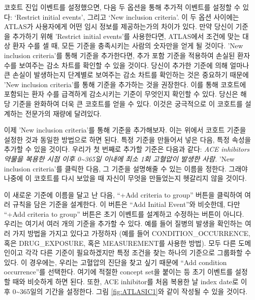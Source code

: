 \documentclass[10.5pt]{book}
\theoremstyle{definition}
\theoremstyle{definition}
\theoremstyle{definition}
\theoremstyle{remark}
\begin{document}
코호트 진입 이벤트를 설정했으면, 다음 두 옵션을 통해 추가적 이벤트를
설정할 수 있다: `Restrict initial events', 그리고 `New inclusion
criteria'. 이 두 옵션 사이에는 ATLAS가 사용자에게 어떤 임시 정보를
제공하는가의 차이가 있다. 만약 당신이 기준을 추가하기 위해 'Restrict
initial events'를 사용한다면, ATLAS에서 조건에 맞는 대상 환자 수를 셀
때, 모든 기준을 충족시키는 사람의 숫자만을 얻게 될 것이다. 'New
inclusion criteria'를 통해 기준을 추가한다면, 추가 포함 기준을 적용하여
손실된 환자 수를 보여주는 감소 차트를 확인할 수 있을 것이다. 당신이
추가한 기준에 의해 얼마나 큰 손실이 발생하는지 단계별로 보여주는 감소
차트를 확인하는 것은 중요하기 때문에 'New inclusion criteria'를 통해
기준을 추가하는 것을 권장한다. 이를 통해 코호트에 포함되는 환자 수를
급격하게 감소시키는 기준이 무엇인지 확인할 수 있다. 당신은 해당 기준을
완화하여 더욱 큰 코호트를 얻을 수 있다. 이것은 궁극적으로 이 코호트를
설계하는 전문가의 재량에 달려있다.

이제 'New inclusion criteria'를 통해 기준을 추가해보자. 이는 위에서
코호트 기준을 설정한 것과 동일한 방법으로 하면 된다. 특정 기준을
만들어서 넣은 다음, 특정 속성을 추가할 수 있을 것이다. 우리가 첫 번째로
추가할 기준은 다음과 같다: \emph{ACE inhibitors 약물을 복용한 시점 이후
0\textasciitilde{}365일 이내에 최소 1회 고혈압이 발생한 사람.} 'New
inclusion criteria'를 클릭한 다음, 그 기준을 설명해줄 수 있는 이름을
정한다. 그래야 나중에 이 코호트를 다시 보았을 때 자신이 무엇을
만들었는지 헷갈리지 않을 것이다.

이 새로운 기준에 이름을 달고 난 다음, ``+Add criteria to group'' 버튼을
클릭하여 여러 규칙을 담은 기준을 설계한다. 이 버튼은 ``Add Initial
Event''와 비슷한데, 다만 ``+Add criteria to group'' 버튼은 초기 이벤트를
설계하고 수정하는 버튼이 아니다. 우리는 여기서 여러 개의 기준을 추가할
수 있다. 예를 들어 질병의 발생을 확인하는 여러 가지 방법을 가지고 있다고
가정하자 (예를 들어 CONDITION\_OCCURRENCE, 혹은 DRUG\_EXPOSURE, 혹은
MEASUREMENT를 사용한 방법). 모두 다른 도메인이고 각각 다른 기준이
필요하겠지만 특정 조건을 찾는 하나의 기준으로 그룹화할 수 있다. 이
경우에는, 우리는 고혈압의 진단을 찾고 싶기 때문에 ``Add condition
occurrence''를 선택한다. 여기에 적절한 concept set을 붙이는 등 초기
이벤트를 설정할 때와 비슷하게 하면 된다. 또한, ACE inhibitor를 처음
복용한 날 index date로 이후 0\textasciitilde{}365일의 기간을 설정한다.
그림 \ref{fig:ATLASIC1}와 같이 작성될 수 있을 것이다.
\end{document}

